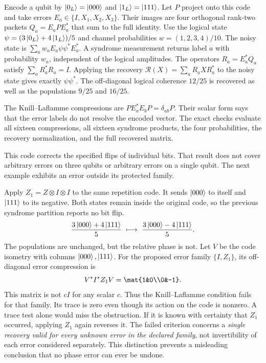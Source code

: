 Encode a qubit by $\left|0_L\right\rangle=\left|000\right\rangle$ and $\left|1_L\right\rangle=\left|111\right\rangle$. Let $P$ project onto this code and take errors $E_a\in\{I,X_1,X_2,X_3\}$. Their images are four orthogonal rank-two packets $Q_a=E_aPE_a^*$ that sum to the full identity.
Use the logical state $\psi=(3\left|0_L\right\rangle+4\left|1_L\right\rangle)/5$ and channel probabilities $w=(1,2,3,4)/10$. The noisy state is $\sum_aw_aE_a\psi\psi^*E_a^*$. A syndrome measurement returns label $a$ with probability $w_a$, independent of the logical amplitudes.
The operators $R_a=E_a^*Q_a$ satisfy $\sum_aR_a^*R_a=I$. Applying the recovery $\mathcal R(X)=\sum_aR_aXR_a^*$ to the noisy state gives exactly $\psi\psi^*$. The off-diagonal logical coherence $12/25$ is recovered as well as the populations $9/25$ and $16/25$.

The Knill--Laflamme compressions are $PE_a^*E_bP=\delta_{ab}P$. Their scalar form says that the error labels do not resolve the encoded vector. The exact checks evaluate all sixteen compressions, all sixteen syndrome products, the four probabilities, the recovery normalization, and the full recovered matrix.

This code corrects the specified flips of individual bits. That result does not cover arbitrary errors on three qubits or arbitrary errors on a single qubit. The next example exhibits an error outside its protected family.

Apply $Z_1=Z\otimes I\otimes I$ to the same repetition code. It sends $\left|000\right\rangle$ to itself and $\left|111\right\rangle$ to its negative. Both states remain inside the original code, so the previous syndrome partition reports no bit flip.
\[
\frac{3\left|000\right\rangle+4\left|111\right\rangle}5
\ \longmapsto\
\frac{3\left|000\right\rangle-4\left|111\right\rangle}5.
\]
The populations are unchanged, but the relative phase is not.
Let $V$ be the code isometry with columns $\left|000\right\rangle,\left|111\right\rangle$. For the proposed error family $\{I,Z_1\}$, its off-diagonal error compression is
\[
V^*I^*Z_1V=\mat{1&0\\0&-1}.
\]
This matrix is not $cI$ for any scalar $c$. Thus the Knill--Laflamme condition fails for that family. Its trace is zero even though its action on the code is nonzero. A trace test alone would miss the obstruction.
\head{Known correction versus family recovery}
If it is known with certainty that $Z_1$ occurred, applying $Z_1$ again reverses it. The failed criterion concerns a \emph{single recovery valid for every unknown error in the declared family}, not invertibility of each error considered separately. This distinction prevents a misleading conclusion that no phase error can ever be undone.

